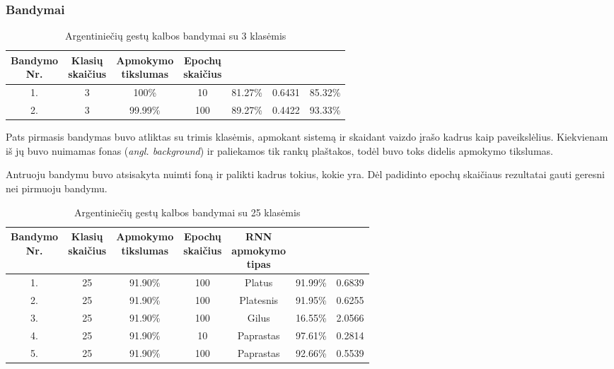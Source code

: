 \documentclass{VUMIFPSbakalaurinis}
\begin{document}
\subsubsection{Bandymai}
\begin{table}[H]\footnotesize
	\centering
	\caption{Argentiniečių gestų kalbos bandymai su 3 klasėmis}
	{\begin{tabular}{| c | c | c | c | c | c | c |} \hline
		\thead{Bandymo\\Nr.} & \thead{Klasių\\skaičius} & \thead{Apmokymo\\tikslumas} & \thead{Epochų\\skaičius} & \thead{Tikslumas} & \thead{Praradimas} & \thead{Testavimas}  \\
		\hline
		1. & 3 & 100\% & 10 & 81.27\% & 0.6431 & 85.32\% \\
		\hline
		2. & 3 & 99.99\% & 100 & 89.27\% & 0.4422 & 93.33\% \\
		\hline
	\end{tabular}}
	\label{tab:asl-bandymai1}
\end{table}

Pats pirmasis bandymas buvo atliktas su trimis klasėmis, apmokant sistemą ir skaidant vaizdo įrašo kadrus kaip paveikslėlius. Kiekvienam iš jų buvo nuimamas fonas (\textit{angl. background}) ir paliekamos tik rankų plaštakos, todėl buvo toks didelis apmokymo tikslumas.

Antruoju bandymu buvo atsisakyta nuimti foną ir palikti kadrus tokius, kokie yra. Dėl padidinto epochų skaičiaus rezultatai gauti geresni nei pirmuoju bandymu.

\begin{table}[H]\footnotesize
	\centering
	\caption{Argentiniečių gestų kalbos bandymai su 25 klasėmis}
	{\begin{tabular}{| c | c | c | c | c | c | c |} \hline
		\thead{Bandymo\\Nr.} & \thead{Klasių\\skaičius} & \thead{Apmokymo\\tikslumas} & \thead{Epochų\\skaičius} & \thead{RNN\\apmokymo\\tipas} & \thead{Tikslumas} & \thead{Praradimas}  \\
		\hline
		1. & 25 & 91.90\% & 100 & Platus & 91.99\% & 0.6839 \\
		\hline
		2. & 25 & 91.90\% & 100 & Platesnis & 91.95\% & 0.6255 \\
		\hline
		3. & 25 & 91.90\% & 100 & Gilus & 16.55\% & 2.0566 \\
		\hline
		4. & 25 & 91.90\% & 10 & Paprastas & 97.61\% & 0.2814 \\
		\hline
		5. & 25 & 91.90\% & 100 & Paprastas & 92.66\% & 0.5539 \\
		\hline
	\end{tabular}}
	\label{tab:asl-bandymai2}
\end{table}
\end{document}
